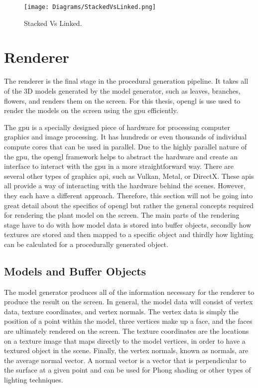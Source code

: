 \begin{figure}[htbp]
	{\centering
		\vspace{7px}
		\texttt{[image: Diagrams/StackedVsLinked.png]}\label{stackedvslinked}
		\caption{Stacked Vs Linked.}
	}
\end{figure}
\FloatBarrier

\section{Renderer}

\noindent
The renderer is the final stage in the procedural generation pipeline. It takes all of the 3D models generated by the model generator, such as leaves, branches, flowers, and renders them on the screen.  For this thesis, \acrshort{opengl} is use used to render the models on the screen using the \acrshort{gpu} efficiently. 

The \acrshort{gpu} is a specially designed piece of hardware for processing computer graphics and image processing. It has hundreds or even thousands of individual compute cores that can be used in parallel. Due to the highly parallel nature of the \acrshort{gpu}, the \acrshort{opengl} framework helps to abstract the hardware and create an interface to interact with the \acrshort{gpu} in a more straightforward way. There are several other types of graphics \acrshort{api}, such as Vulkan, Metal, or DirectX. These \acrshort{api}s all provide a way of interacting with the hardware behind the scenes. However, they each have a different approach. Therefore, this section will not be going into great detail about the specifics of \acrshort{opengl} but rather the general concepts required for rendering the plant model on the screen. The main parts of the rendering stage have to do with how model data is stored into buffer objects, secondly how textures are stored and then mapped to a specific object and thirdly how lighting can be calculated for a procedurally generated object.

\subsection{Models and Buffer Objects}

The model generator produces all of the information necessary for the renderer to produce the result on the screen. In general, the model data will consist of vertex data, texture coordinates, and vertex normals. The vertex data is simply the position of a point within the model, three vertices make up a face, and the faces are ultimately rendered on the screen. The texture coordinates are the locations on a texture image that maps directly to the model vertices, in order to have a textured object in the scene. Finally, the vertex normals, known as normals, are the average normal vector. A normal vector is a vector that is perpendicular to the surface at a given point and can be used for Phong shading or other types of lighting techniques.  

